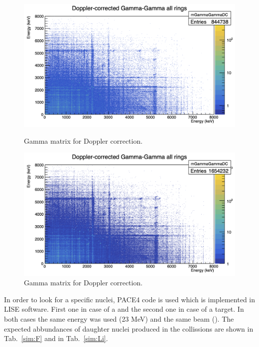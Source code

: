 \begin{figure}[h]
  \centering
  \begin{minipage}[b]{0.45\textwidth}
    \vspace{5mm}
    \includegraphics[width=\textwidth]{img/matrix_F.png}
    \caption{Gamma matrix for  Doppler correction.}
    \label{matrix:F}
  \end{minipage}
  \hfill
  \begin{minipage}[b]{0.45\textwidth}
    \vspace{5mm}
    \includegraphics[width=\textwidth]{img/matrix_Li.png}
    \caption{Gamma matrix for  Doppler correction.}
    \label{matrix:Li}
  \end{minipage}
\end{figure}

In order to look for a specific nuclei, PACE4 code is used which is
\cite{lise} implemented in LISE software. First one in case of a 
and the second one in case of a  target.
In both cases the same energy was used (23 MeV) and
the same beam (). The expected abbundances of daughter nuclei
produced in the collissions are shown in Tab.~\ref{sim:F} and in
Tab.~\ref{sim:Li}.

